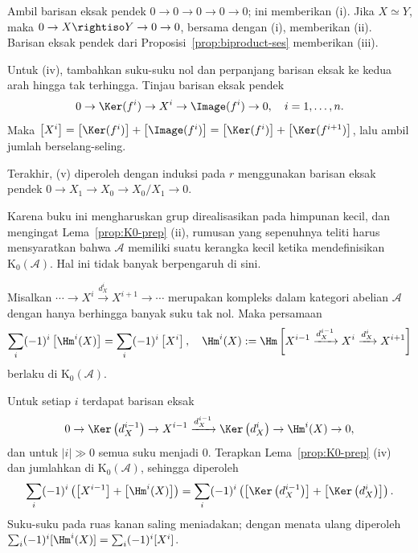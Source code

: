 \begin{bukti}
Ambil barisan eksak pendek $0\to0\to0\to0\to0$; ini memberikan (i).
Jika $X\simeq Y$, maka $0\to X\rightiso Y\to0\to0$, bersama dengan (i),
memberikan (ii). Barisan eksak pendek dari
Proposisi~\ref{prop:biproduct-ses} memberikan (iii).

Untuk (iv), tambahkan suku-suku nol dan perpanjang barisan eksak ke kedua arah
hingga tak terhingga. Tinjau barisan eksak pendek
\[0\to\Ker(f^i)\to X^i\to\Image(f^i)\to0,\quad i=1,\ldots,n.\]
Maka
$\left[X^i\right]=\left[\Ker(f^i)\right]+\left[\Image(f^i)\right]
=\left[\Ker(f^i)\right]+\left[\Ker(f^{i+1})\right]$,
lalu ambil jumlah berselang-seling.

Terakhir, (v) diperoleh dengan induksi pada $r$ menggunakan barisan eksak
pendek $0\to X_1\to X_0\to X_0/X_1\to0$.
\end{bukti}

\begin{catatan}
Karena buku ini mengharuskan grup direalisasikan pada himpunan kecil, dan
mengingat Lema~\ref{prop:K0-prep} (ii), rumusan yang sepenuhnya teliti harus
mensyaratkan bahwa $\mathcal{A}$ memiliki suatu kerangka kecil
\cite[Lema 2.2.12]{Li1} ketika mendefinisikan
$\mathrm{K}_0(\mathcal{A})$. Hal ini tidak banyak berpengaruh di sini.
\end{catatan}

\begin{teorema}\label{prop:EP}
Misalkan
$\cdots\to X^i\xrightarrow{d_X^i}X^{i+1}\to\cdots$
merupakan kompleks dalam kategori abelian $\mathcal{A}$ dengan hanya berhingga
banyak suku tak nol. Maka persamaan
\[\sum_i(-1)^i\left[\Hm^i(X)\right]
=\sum_i(-1)^i\left[X^i\right],\quad
\Hm^i(X):=\Hm\left[X^{i-1}\xrightarrow{d_X^{i-1}}X^i
\xrightarrow{d_X^i}X^{i+1}\right]\]
berlaku di $\mathrm{K}_0(\mathcal{A})$.
\end{teorema}

\begin{bukti}
Untuk setiap $i$ terdapat barisan eksak
\[0\to\Ker\left(d_X^{i-1}\right)\to X^{i-1}
\xrightarrow{d_X^{i-1}}\Ker\left(d_X^i\right)
\to\Hm^i(X)\to0,\]
dan untuk $|i|\gg0$ semua suku menjadi $0$. Terapkan
Lema~\ref{prop:K0-prep} (iv) dan jumlahkan di
$\mathrm{K}_0(\mathcal{A})$, sehingga diperoleh
\[\sum_i(-1)^i
\left(\left[X^{i-1}\right]+\left[\Hm^i(X)\right]\right)
=\sum_i(-1)^i
\left(\left[\Ker\left(d_X^{i-1}\right)\right]
+\left[\Ker\left(d_X^i\right)\right]\right).\]
Suku-suku pada ruas kanan saling meniadakan; dengan menata ulang diperoleh
$\sum_i(-1)^i[\Hm^i(X)]=\sum_i(-1)^i[X^i]$.
\end{bukti}

